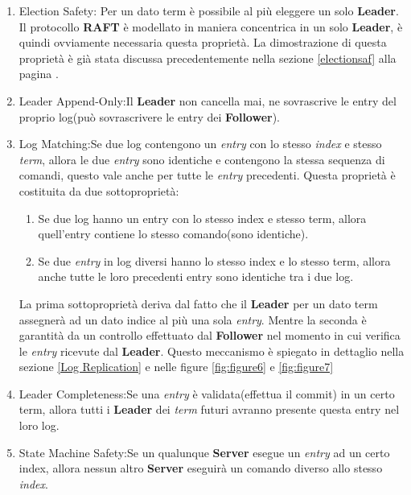 \begin{enumerate}
	\item Election Safety: Per un dato term è possibile al più eleggere un solo \textbf{Leader}.
	Il protocollo \textbf{RAFT} è modellato in maniera concentrica in un solo \textbf{Leader}, è quindi ovviamente necessaria questa proprietà.
	La dimostrazione di questa proprietà è già stata discussa precedentemente nella sezione \ref{electionsaf} alla pagina \pageref{electionsaf}.
	\item Leader Append-Only:Il \textbf{Leader} non cancella mai, ne sovrascrive le entry del proprio log(può sovrascrivere le entry dei \textbf{Follower}).

	\item Log Matching:Se due log contengono un \textit{entry} con lo stesso \textit{index} e stesso \textit{term}, allora le due \textit{entry} sono identiche e contengono la stessa sequenza di comandi, questo vale anche per tutte le \textit{entry} precedenti.
	Questa proprietà è costituita da due sottoproprietà:
	\begin{enumerate}
		\item Se due log hanno un entry con lo stesso index e stesso term, allora quell'entry contiene lo stesso comando(sono identiche).
		\item Se due \textit{entry} in log diversi hanno lo stesso index e lo stesso term, allora anche tutte le loro precedenti entry sono identiche tra i due log.
	\end{enumerate}
	La prima sottoproprietà deriva dal fatto che il \textbf{Leader} per un dato term assegnerà ad un dato indice al più una sola \textit{entry}.
	Mentre la seconda è garantità da un controllo effettuato dal \textbf{Follower} nel momento in cui verifica le \textit{entry} ricevute dal \textbf{Leader}.
	Questo meccanismo è spiegato in dettaglio nella sezione \ref{Log Replication} e nelle figure  \ref{fig:figure6} e \ref{fig:figure7}
	\item Leader Completeness:Se una \textit{entry} è validata(effettua il commit) in un certo term, allora tutti i \textbf{Leader} dei \textit{term} futuri avranno presente questa entry nel loro log.
	\item State Machine Safety:Se un qualunque \textbf{Server} esegue un \textit{entry} ad un certo index, allora nessun altro \textbf{Server} eseguirà un comando diverso allo stesso \textit{index}.
\end{enumerate}
